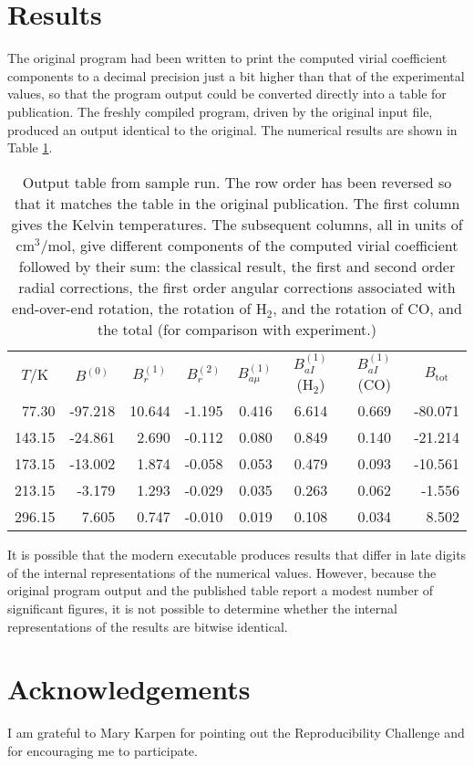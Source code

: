 \section{Results}
The original program had been written to print the computed virial coefficient components to a decimal precision just a bit higher than that of the experimental values, so that the program output could be converted directly into a table for publication.  The freshly compiled program, driven by the original input file, produced an output identical to the original.  The numerical results are shown in Table \ref{tab:output}.
\begin{table}[h]
  \centering
  \begin{tabular}{rrrrrccr}
        \multicolumn{1}{c}{$T$/K}  &  \multicolumn{1}{c}{$B^{(0)}$} & \multicolumn{1}{c}{$B^{(1)}_{r}$} & \multicolumn{1}{c}{$B^{(2)}_{r}$} & \multicolumn{1}{c}{$B^{(1)}_{a\mu}$ }&  \multicolumn{1}{c}{$B^{(1)}_{aI}$(H$_2$) } & \multicolumn{1}{c}{$B^{(1)}_{aI}$(CO)  }&   \multicolumn{1}{c}{$B_{\text{tot}}$ }  \\
   77.30   &  -97.218   &  10.644  &  -1.195 &    0.416  &   6.614&     0.669  & -80.071 \\
  143.15   &  -24.861  &   2.690   & -0.112  &   0.080  &   0.849   &  0.140  & -21.214 \\
  173.15  &   -13.002   &  1.874   & -0.058  &   0.053    & 0.479  &   0.093 &  -10.561 \\
  213.15   &   -3.179  &   1.293   & -0.029   &  0.035    & 0.263  &   0.062  &  -1.556 \\
    296.15  &   7.605   &  0.747&    -0.010  &   0.019 &    0.108 &    0.034  &   8.502
  \end{tabular}

  \caption{Output table from sample run.  The row order has been reversed so that it matches the table in the original publication.  The first column gives the Kelvin temperatures.  The subsequent columns, all in units of cm$^3$/mol, give different components of the computed virial coefficient followed by their sum: the classical result, the first and second order radial corrections, the first order angular corrections associated with end-over-end rotation, the rotation of H$_2$, and the rotation of CO, and the total (for comparison with experiment.) }
  \label{tab:output}  
\end{table}




It is possible that the modern executable produces results that differ in late digits of the internal representations of the numerical values.  However, because the original program output and the published table report a modest number of significant figures, it is not possible to determine whether the internal representations of the results are bitwise identical.



\section{Acknowledgements}
I am grateful to Mary Karpen for pointing out the Reproducibility Challenge and for encouraging me to participate.